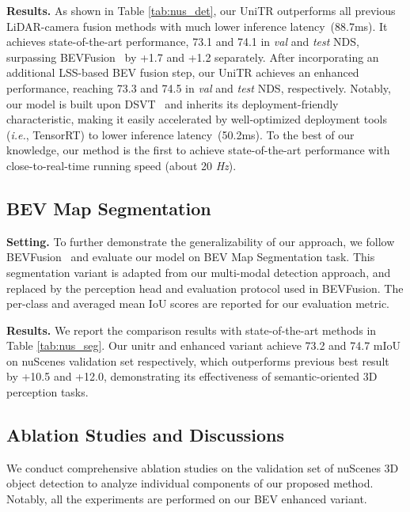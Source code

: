 \documentclass[10pt,twocolumn,letterpaper]{article}
\begin{document}
\noindent \textbf{Results.} As shown in Table \ref{tab:nus_det}, our UniTR outperforms all previous LiDAR-camera fusion methods with much lower inference latency~(88.7ms). It achieves state-of-the-art performance, 73.1 and 74.1 in \textit{val} and \textit{test} NDS, surpassing BEVFusion~\cite{liu2022bevfusion} by +1.7 and +1.2 separately. After incorporating an additional LSS-based BEV fusion step, our UniTR achieves an enhanced performance, reaching 73.3 and 74.5 in \textit{val} and \textit{test} NDS, respectively. Notably, our model is built upon DSVT~\cite{wang2023dsvt} and inherits its deployment-friendly characteristic, making it easily accelerated by well-optimized deployment tools (\textit{i.e.}, TensorRT) to lower inference latency~(50.2ms). To the best of our knowledge, our method is the first to achieve state-of-the-art performance with close-to-real-time running speed (about 20 \textit{Hz}).
\subsection{BEV Map Segmentation} 
\noindent \textbf{Setting.} To further demonstrate the generalizability of our approach, we follow BEVFusion~\cite{liu2022bevfusion} and evaluate our model on BEV Map Segmentation task. This segmentation variant is adapted from our multi-modal detection approach, and replaced by the perception head and evaluation protocol used in BEVFusion. The per-class and averaged mean IoU scores are reported for our evaluation metric. 

\noindent \textbf{Results.} We report the comparison results with state-of-the-art methods in Table \ref{tab:nus_seg}. Our unitr and enhanced variant achieve 73.2 and 74.7 mIoU on nuScenes validation set respectively, which outperforms previous best result~\cite{liu2022bevfusion} by +10.5 and +12.0, demonstrating its effectiveness of semantic-oriented 3D perception tasks.
\subsection{Ablation Studies and Discussions} We conduct comprehensive ablation studies on the validation set of nuScenes 3D object detection to analyze individual components of our proposed method. Notably, all the experiments are performed on our BEV enhanced variant.
\end{document}
